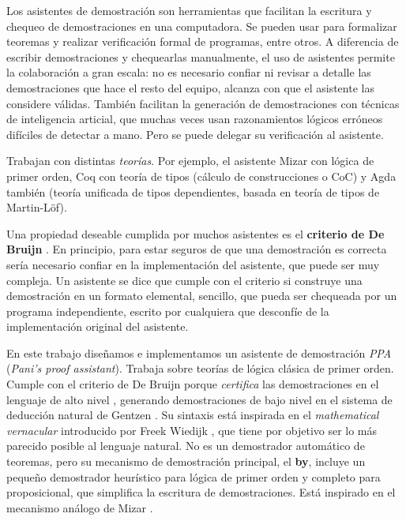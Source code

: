 Los asistentes de demostración son herramientas que facilitan la escritura y chequeo de demostraciones en una computadora. Se pueden usar para formalizar teoremas y realizar verificación formal de programas, entre otros. A diferencia de escribir demostraciones y chequearlas manualmente, el uso de asistentes permite la colaboración a gran escala: no es necesario confiar ni revisar a detalle las demostraciones que hace el resto del equipo, alcanza con que el asistente las considere válidas. También facilitan la generación de demostraciones con técnicas de inteligencia articial, que muchas veces usan razonamientos lógicos erróneos difíciles de detectar a mano. Pero se puede delegar su verificación al asistente.

Trabajan con distintas \textit{teorías}. Por ejemplo, el asistente Mizar \cite{mizar} con lógica de primer orden, Coq \cite{coq} con teoría de tipos (cálculo de construcciones o CoC) y Agda \cite{agda} también (teoría unificada de tipos dependientes, basada en teoría de tipos de Martin-Löf).

Una propiedad deseable cumplida por muchos asistentes es el \textbf{criterio de De Bruijn} \cite{freek-bruijn}. En principio, para estar seguros de que una demostración es correcta sería necesario confiar en la implementación del asistente, que puede ser muy compleja. Un asistente se dice que cumple con el criterio si construye una demostración en un formato elemental, sencillo, que pueda ser chequeada por un programa independiente, escrito por cualquiera que desconfíe de la implementación original del asistente.

En este trabajo diseñamos e implementamos un asistente de demostración \textit{PPA}
(\textit{Pani's proof assistant}). Trabaja sobre teorías de lógica clásica de
primer orden. Cumple con el criterio de De Bruijn porque \textit{certifica} las
demostraciones en el lenguaje de alto nivel \ppaLang{}, generando demostraciones
de bajo nivel en el sistema de deducción natural de Gentzen \cite{gentzen-1935}. Su sintaxis está inspirada en el
\textit{mathematical vernacular} introducido por Freek Wiedijk
\cite{freek-mv} \cite{wenzel-isar}, que tiene por objetivo ser lo más parecido posible al lenguaje
natural. No es un demostrador automático de teoremas, pero su mecanismo de
demostración principal, el \textbf{by}, incluye un pequeño demostrador
heurístico para lógica de primer orden y completo para proposicional, que
simplifica la escritura de demostraciones. Está inspirado en el mecanismo análogo de Mizar \cite{freek-by}.

